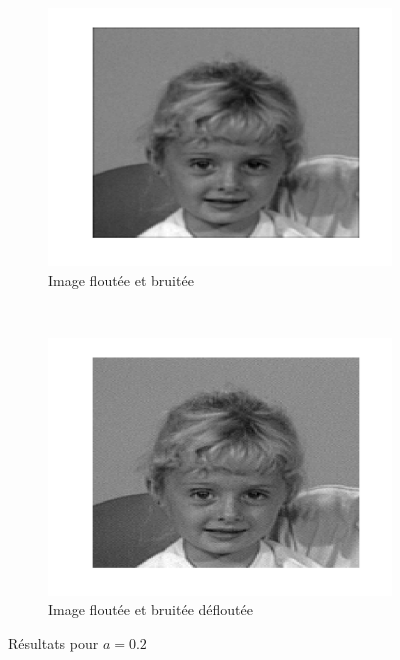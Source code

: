\begin{figure}
\begin{subfigure}[b]{0.45\textwidth}
    \includegraphics[width=\textwidth]{Q2/noise_20.png}
    \caption{Image floutée et bruitée}
    \label{fig:a2noise}
  \end{subfigure}%
  ~
  \begin{subfigure}[b]{0.45\textwidth}
    \includegraphics[width=\textwidth]{Q2/unblurred_20.png}
    \caption{Image floutée et bruitée défloutée}
    \label{fig:a2unblurred}
  \end{subfigure}
  \caption{Résultats pour $a = 0.2$}\label{fig:a2}
\end{figure}

